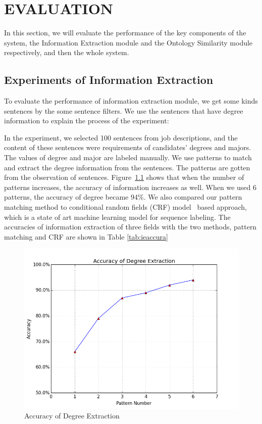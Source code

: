 \chapter{EVALUATION}

In this section, we will evaluate the performance of the key components of the system, the Information Extraction module and the Ontology Similarity module respectively, and then the whole system.

\section{Experiments of Information Extraction }

To evaluate the performance of information extraction module, we get some kinds sentences by the some sentence filters. We use the sentences that have degree information to explain the process of the experiment:

In the experiment, we selected 100 sentences from job descriptions, and the content of these sentences were requirements of candidates' degrees and majors. The values of degree and major are labeled manually. We use patterns to  match and extract the degree information from the sentences. The patterns are gotten from the observation of sentences. Figure~\ref{fig:degree_accuracy} shows that when the number of  patterns increases, the accuracy of information increases as well. When we used 6 patterns, the accuracy of degree became 94\%. We also compared our pattern matching method to conditional random fields (CRF) model~\cite{lafferty2001conditional}  based approach, which is a state of art machine learning model for sequence labeling.  The accuracies of information extraction of three fields with the two methods, pattern matching and CRF are shown in Table \ref{tab:ieaccura}

\begin{figure}[htbp]
  \centering
  \includegraphics[scale=0.5]{images/degree_accuracy.png}
  \caption{Accuracy of Degree Extraction  }
  \label{fig:degree_accuracy}
\end{figure}


